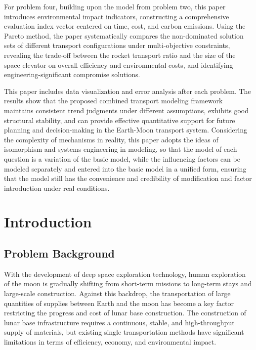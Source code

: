 \documentclass[12pt]{article}
\begin{document}
\begin{center}
For problem four, building upon the model from problem two, this paper introduces environmental impact indicators, constructing a comprehensive evaluation index vector centered on time, cost, and carbon emissions. Using the Pareto method, the paper systematically compares the non-dominated solution sets of different transport configurations under multi-objective constraints, revealing the trade-off between the rocket transport ratio and the size of the space elevator on overall efficiency and environmental costs, and identifying engineering-significant compromise solutions.

This paper includes data visualization and error analysis after each problem. The results show that the proposed combined transport modeling framework maintains consistent trend judgments under different assumptions, exhibits good structural stability, and can provide effective quantitative support for future planning and decision-making in the Earth-Moon transport system. Considering the complexity of mechanisms in reality, this paper adopts the ideas of isomorphism and systems engineering in modeling, so that the model of each question is a variation of the basic model, while the influencing factors can be modeled separately and entered into the basic model in a unified form, ensuring that the model still has the convenience and credibility of modification and factor introduction under real conditions.

\end{center}

\clearpage
\pagestyle{fancy}
\tableofcontents
\newpage
\setcounter{page}{1}
\section{Introduction}

\subsection{Problem Background}

With the development of deep space exploration technology, human exploration of the moon is gradually shifting from short-term missions to long-term stays and large-scale construction. Against this backdrop, the transportation of large quantities of supplies between Earth and the moon has become a key factor restricting the progress and cost of lunar base construction. The construction of lunar base infrastructure requires a continuous, stable, and high-throughput supply of materials, but existing single transportation methods have significant limitations in terms of efficiency, economy, and environmental impact.
\end{document}
